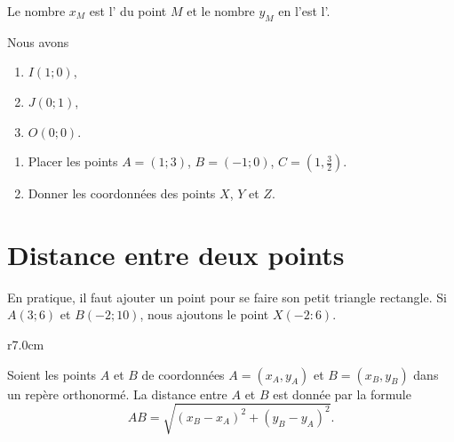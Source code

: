 \begin{Aretenir}
    Le nombre \( x_M\) est l' du point \( M\) et le nombre \( y_M\) en l'est l'.
\end{Aretenir}


Nous avons
\begin{enumerate}
    \item
       \( I(1;0)\),
   \item
       \( J(0;1)\),
   \item
       \( O(0;0)\).
\end{enumerate}



%   

\vspace{1cm}

\begin{center}
    
\end{center}

    \begin{enumerate}
        \item
            Placer les points \( A=(1;3)\), \( B=(-1;0)\), \( C=(1,\frac{ 3 }{2})\).
        \item
            Donner les coordonnées des points \( X\), \( Y\) et \( Z\).
    \end{enumerate}
    

\section{Distance entre deux points}

En pratique, il faut ajouter un point pour se faire son petit triangle rectangle. Si \( A(3;6)\) et \( B(-2;10)\), nous ajoutons le point \( X(-2:6)\).

\begin{Aretenir}

\begin{wrapfigure}{r}{7.0cm}
   \vspace{-1.5cm}        %
   \centering
   
\end{wrapfigure}

        Soient les points \( A\) et \( B\) de coordonnées \( A=(x_A,y_A)\) et \( B=(x_B,y_B)\) dans un repère orthonormé. La distance entre \( A\) et \( B\) est donnée par la formule
        \begin{equation*}
            AB =\sqrt{(x_B-x_A)^2+(y_B-y_A)^2}.
        \end{equation*}
    \end{Aretenir}

